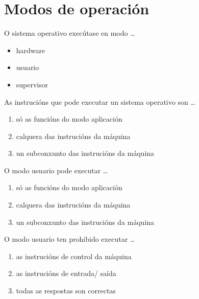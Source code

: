 \section{Modos de operación}

\begin{diapo}\begin{frame}{O sistema operativo execútase en modo \dots}
\begin{itemize}
\item hardware\pause
\item usuario \pause
\item supervisor 
\end{itemize}
\end{frame}\end{diapo} 
\begin{diapo}\begin{frame}{As instrucións que pode executar un sistema operativo son \dots}
\begin{enumerate}
\item só as funcións do modo aplicación \pause
\item calquera das instrucións da máquina \pause
\item un subconxunto das instrucións da máquina
\end{enumerate} 
\end{frame} 
\end{diapo} 


\begin{diapo}\begin{frame}{O modo usuario pode executar \dots}
\begin{enumerate}
\item só as funcións do modo aplicación \pause
\item calquera das instrucións da máquina \pause
\item un subconxunto das instrucións da máquina
\end{enumerate} 
\end{frame} 
\end{diapo} 
\begin{diapo}\begin{frame}{O modo usuario ten prohibido  executar \dots}
\begin{enumerate}
\item  as instrucións de control da máquina \pause
\item  as instrucións de entrada/ saída\pause
\item todas as respostas son correctas
\end{enumerate} 
\end{frame} 
\end{diapo} 


